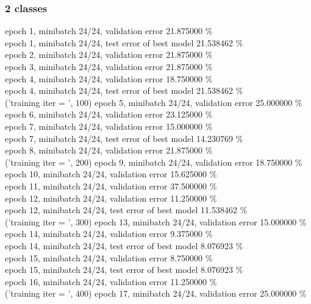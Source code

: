 \documentclass[a4paper]{article}
\begin{document}
\subsubsection{2 classes}
epoch 1, minibatch 24/24, validation error 21.875000 \% \\
     epoch 1, minibatch 24/24, test error of best model 21.538462 \% \\
epoch 2, minibatch 24/24, validation error 21.875000 \% \\
epoch 3, minibatch 24/24, validation error 21.875000 \% \\
epoch 4, minibatch 24/24, validation error 18.750000 \% \\
     epoch 4, minibatch 24/24, test error of best model 21.538462 \% \\
('training \@ iter = ', 100)
epoch 5, minibatch 24/24, validation error 25.000000 \% \\
epoch 6, minibatch 24/24, validation error 23.125000 \% \\
epoch 7, minibatch 24/24, validation error 15.000000 \% \\
     epoch 7, minibatch 24/24, test error of best model 14.230769 \% \\
epoch 8, minibatch 24/24, validation error 21.875000 \% \\
('training \@ iter = ', 200)
epoch 9, minibatch 24/24, validation error 18.750000 \% \\
epoch 10, minibatch 24/24, validation error 15.625000 \% \\
epoch 11, minibatch 24/24, validation error 37.500000 \% \\
epoch 12, minibatch 24/24, validation error 11.250000 \% \\
     epoch 12, minibatch 24/24, test error of best model 11.538462 \% \\
('training \@ iter = ', 300)
epoch 13, minibatch 24/24, validation error 15.000000 \% \\
epoch 14, minibatch 24/24, validation error 9.375000 \% \\
     epoch 14, minibatch 24/24, test error of best model 8.076923 \% \\
epoch 15, minibatch 24/24, validation error 8.750000 \% \\
     epoch 15, minibatch 24/24, test error of best model 8.076923 \% \\
epoch 16, minibatch 24/24, validation error 11.250000 \% \\
('training \@ iter = ', 400)
epoch 17, minibatch 24/24, validation error 25.000000 \% \\
\end{document}
